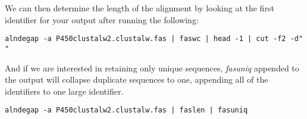 \documentclass[11pt]{article}
\begin{document}
We can then determine the length of the alignment by looking at the
first identifier for your output after running the following:

\begin{verbatim}
alndegap -a P450clustalw2.clustalw.fas | faswc | head -1 | cut -f2 -d" "
\end{verbatim}

And if we are interested in retaining only unique sequences, 
\emph{fasuniq} appended to the output will collapse duplicate sequences to
one, appending all of the identifiers to one large identifier. 

\begin{verbatim}
alndegap -a P450clustalw2.clustalw.fas | faslen | fasuniq
\end{verbatim}
\end{document}
